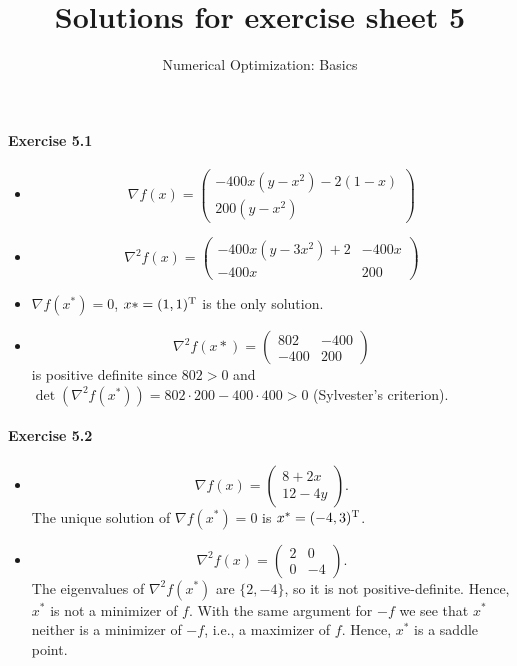 
\title{Solutions for exercise sheet 5}
\subtitle{Numerical Optimization: Basics}

\maketitle

\paragraph{Exercise 5.1} %
\begin{itemize}
\item \[
\nabla f(x) =
\begin{pmatrix}
-400 x(y-x^2)-2(1-x)\\
200(y-x^2)
\end{pmatrix}
\]
\item \[
\nabla^2 f(x) =
\begin{pmatrix}
-400x (y-3x^2) + 2 & -400x\\
-400x              & 200
\end{pmatrix}
\]
\item $\nabla f(x^*) = 0$, $x*=(1,1)^{\text{\upshape T}}$ is the only solution.
\item
\[
\nabla^2 f(x*) =
\begin{pmatrix}
802 & -400\\
-400 & 200
\end{pmatrix}
\]
is positive definite since $802>0$ and $\det(\nabla^2 f(x^*)) = 802\cdot200 - 400\cdot 400 > 0$ (Sylvester's criterion).
\end{itemize}


\paragraph{Exercise 5.2} %
\begin{itemize}
\item
\[
\nabla f(x) =
\begin{pmatrix}
8 + 2x\\
12 - 4y
\end{pmatrix}.
\]
The unique solution of $\nabla f(x^*) = 0$ is $x^*=(-4,3)^{\text{\upshape T}}$.
\item
\[
\nabla^2 f(x) =
\begin{pmatrix}
2 & 0\\
0 & - 4
\end{pmatrix}.
\]
The eigenvalues of $\nabla^2 f(x^*)$ are $\{2, -4\}$, so it is not positive-definite. Hence, $x^*$ is not a minimizer of $f$. With the same argument for $-f$ we see that $x^*$ neither is a minimizer of $-f$, i.e., a maximizer of $f$. Hence, $x^*$ is a saddle point.

\end{itemize}

